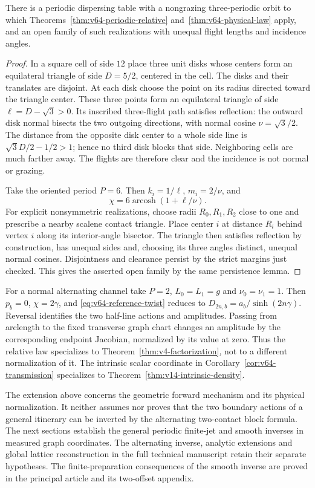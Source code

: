 \begin{proposition}
\label{prop:v64-triangle}
There is a periodic dispersing table with a nongrazing three-periodic
orbit to which Theorems~\ref{thm:v64-periodic-relative}
and~\ref{thm:v64-physical-law} apply, and an open family of such
realizations with unequal flight lengths and incidence angles.
\end{proposition}
\begin{proof}
In a square cell of side $12$ place three unit disks whose centers form
an equilateral triangle of side $D=5/2$, centered in the cell.
The disks and their translates are disjoint.  At each disk choose the
point on its radius directed toward the triangle center.  These three
points form an equilateral triangle of side
$\ell=D-\sqrt3>0$.  Its inscribed three-flight path satisfies reflection:
the outward disk normal bisects the two outgoing directions, with normal
cosine $\nu=\sqrt3/2$.  The distance from the opposite disk center to
a whole side line is $\sqrt3 D/2-1/2>1$; hence no third disk blocks
that side.  Neighboring cells are much farther away.  The flights are
therefore clear and the incidence is not normal or grazing.

Take the oriented period $P=6$.  Then $k_i=1/\ell$,
$m_i=2/\nu$, and
\[
 \chi=6\operatorname{arcosh}(1+\ell/\nu).
\]
For explicit nonsymmetric realizations, choose radii $R_0,R_1,R_2$ close to one and prescribe a nearby scalene
contact triangle.  Place center $i$ at distance $R_i$ behind vertex $i$
along its interior-angle bisector.  The triangle then satisfies reflection
by construction, has unequal sides and, choosing its three angles
distinct, unequal normal cosines.  Disjointness and clearance persist by
the strict margins just checked.  This gives the asserted open family
by the same persistence lemma.
\end{proof}

For a normal alternating channel take $P=2$, $L_0=L_1=g$ and
$\nu_0=\nu_1=1$.  Then $p_b=0$, $\chi=2\gamma$, and
\eqref{eq:v64-reference-twist} reduces to
$D_{2n,b}=a_b/\sinh(2n\gamma)$.  Reversal identifies the two
half-line actions and amplitudes.  Passing from arclength to the fixed
transverse graph chart changes an amplitude by the corresponding
endpoint Jacobian, normalized by its value at zero.  Thus the relative
law specializes to Theorem~\ref{thm:v4-factorization}, not to a different
normalization of it.  The intrinsic scalar coordinate in
Corollary~\ref{cor:v64-transmission} specializes to
Theorem~\ref{thm:v14-intrinsic-density}.

The extension above concerns the geometric forward mechanism and its
physical normalization.  It neither assumes nor proves that the two
boundary actions of a general itinerary can be inverted by the
alternating two-contact block formula.  The next sections establish the general periodic finite-jet and smooth
inverses in measured graph coordinates.  The alternating inverse, analytic
extensions and global lattice reconstruction in the full technical
manuscript retain their separate hypotheses.  The finite-preparation
consequences of the smooth inverse are proved in the principal article
and its two-offset appendix.


